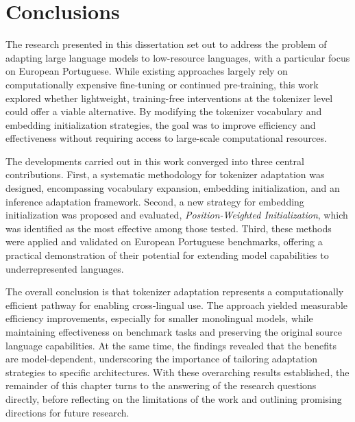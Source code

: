 
\chapter{Conclusions}


\label{chap:conclusions}


The research presented in this dissertation set out to address the problem of adapting large language models to low-resource languages, with a particular focus on European Portuguese. While existing approaches largely rely on computationally expensive fine-tuning or continued pre-training, this work explored whether lightweight, training-free interventions at the tokenizer level could offer a viable alternative. By modifying the tokenizer vocabulary and embedding initialization strategies, the goal was to improve efficiency and effectiveness without requiring access to large-scale computational resources.

The developments carried out in this work converged into three central contributions. First, a systematic methodology for tokenizer adaptation was designed, encompassing vocabulary expansion, embedding initialization, and an inference adaptation framework. Second, a new strategy for embedding initialization was proposed and evaluated, \textit{Position-Weighted Initialization}, which was identified as the most effective among those tested. Third, these methods were applied and validated on European Portuguese benchmarks, offering a practical demonstration of their potential for extending model capabilities to underrepresented languages.

The overall conclusion is that tokenizer adaptation represents a computationally efficient pathway for enabling cross-lingual use. The approach yielded measurable efficiency improvements, especially for smaller monolingual models, while maintaining effectiveness on benchmark tasks and preserving the original source language capabilities. At the same time, the findings revealed that the benefits are model-dependent, underscoring the importance of tailoring adaptation strategies to specific architectures. With these overarching results established, the remainder of this chapter turns to the answering of the research questions directly, before reflecting on the limitations of the work and outlining promising directions for future research.




